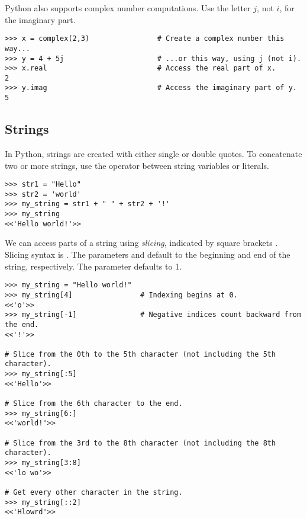 Python also supports complex number computations.
Use the letter $j$, not $i$, for the imaginary part.
\begin{lstlisting}
>>> x = complex(2,3)                # Create a complex number this way...
>>> y = 4 + 5j	                    # ...or this way, using j (not i).
>>> x.real                          # Access the real part of x.
2
>>> y.imag                          # Access the imaginary part of y.
5
\end{lstlisting}

\subsection*{Strings} %

In Python, strings are created with either single or double quotes.
To concatenate two or more strings, use the \li{+} operator between string variables or literals.
\begin{lstlisting}
>>> str1 = "Hello"
>>> str2 = 'world'
>>> my_string = str1 + " " + str2 + '!'
>>> my_string
<<'Hello world!'>>
\end{lstlisting}

We can access parts of a string using \emph{slicing}, indicated by square brackets \li{[ ]}.
Slicing syntax is .
The parameters  and  default to the beginning and end of the string, respectively.
The parameter  defaults to 1.

\begin{lstlisting}
>>> my_string = "Hello world!"
>>> my_string[4]                # Indexing begins at 0.
<<'o'>>
>>> my_string[-1]               # Negative indices count backward from the end.
<<'!'>>

# Slice from the 0th to the 5th character (not including the 5th character).
>>> my_string[:5]
<<'Hello'>>

# Slice from the 6th character to the end.
>>> my_string[6:]
<<'world!'>>

# Slice from the 3rd to the 8th character (not including the 8th character).
>>> my_string[3:8]
<<'lo wo'>>

# Get every other character in the string.
>>> my_string[::2]
<<'Hlowrd'>>
\end{lstlisting}

